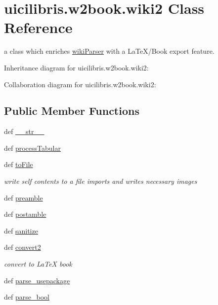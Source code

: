 \hypertarget{classuicilibris_1_1w2book_1_1wiki2}{\section{uicilibris.\-w2book.\-wiki2 \-Class \-Reference}
\label{classuicilibris_1_1w2book_1_1wiki2}
}


a class which enriches \hyperlink{namespaceuicilibris_1_1wikiParser}{wiki\-Parser} with a \-La\-Te\-X/\-Book export feature.  




\-Inheritance diagram for uicilibris.\-w2book.\-wiki2\-:


\-Collaboration diagram for uicilibris.\-w2book.\-wiki2\-:
\subsection*{\-Public \-Member \-Functions}
\begin{DoxyCompactItemize}
\item 
def \hyperlink{classuicilibris_1_1w2book_1_1wiki2_aebf095bf2882eba45654efa22208a279}{\-\_\-\-\_\-str\-\_\-\-\_\-}
\item 
def \hyperlink{classuicilibris_1_1w2book_1_1wiki2_ae23c5f96c061eec8a575b293879b82ee}{process\-Tabular}
\item 
def \hyperlink{classuicilibris_1_1w2book_1_1wiki2_a7959787936e6ba25fa4478c87f362dcb}{to\-File}
\begin{DoxyCompactList}\small\item\em write self contents to a file imports and writes necessary images \end{DoxyCompactList}\item 
def \hyperlink{classuicilibris_1_1w2book_1_1wiki2_ae352150eb67b1cb6c67ee3137f0cf773}{preamble}
\item 
def \hyperlink{classuicilibris_1_1w2book_1_1wiki2_a074e8ba5278ac244c7b5402275abbc42}{postamble}
\item 
def \hyperlink{classuicilibris_1_1w2book_1_1wiki2_abd7f7826ccd713041b9ac86dd9ce4084}{sanitize}
\item 
def \hyperlink{classuicilibris_1_1w2book_1_1wiki2_ac94ea48f5b21a87eb0dda32a26be71c5}{convert2}
\begin{DoxyCompactList}\small\item\em convert to \-La\-Te\-X book \end{DoxyCompactList}\item 
def \hyperlink{classuicilibris_1_1w2book_1_1wiki2_a74c8ffd775e73f877a98adc48592a488}{parse\-\_\-usepackage}
\item 
def \hyperlink{classuicilibris_1_1w2book_1_1wiki2_a65fc5e3a732878444028091cbd03ac76}{parse\-\_\-bool}
\end{DoxyCompactItemize}

